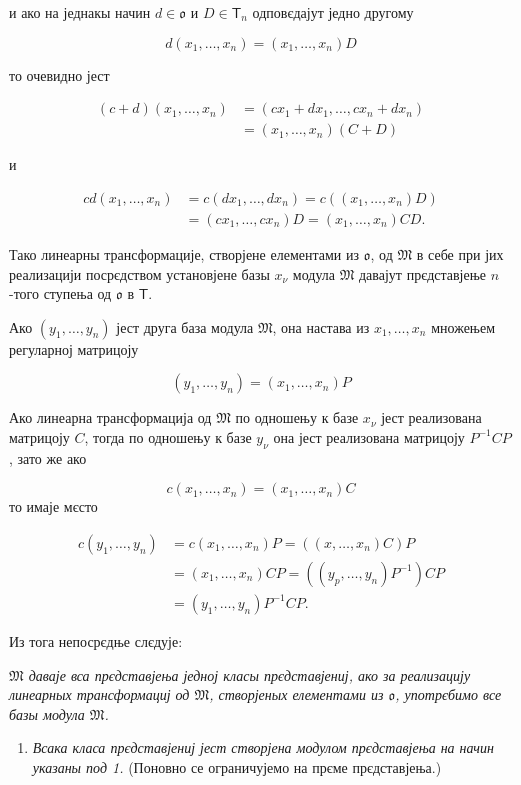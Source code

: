 \documentclass[11pt]{article}
\providecommand{\tightlist}{\setlength{\itemsep}{0pt}\setlength{\parskip}{0pt}}
\begin{document}
и ако на једнакы начин \(d\in\mathfrak{o}\) и \(D\in\mathsf T_n\) одповєдајут једно другому

\[
d(x_1,\ldots,x_n)=(x_1,\ldots,x_n)D
\]

то очевидно јест

\[
\begin{aligned}
(c+d)(x_1,\ldots,x_n)
&=(cx_1+dx_1,\ldots,cx_n+dx_n)\\
&=(x_1,\ldots,x_n)(C+D)
\end{aligned}
\]

и

\[
\begin{aligned}
cd(x_1,\ldots,x_n)
&=c(dx_1,\ldots,dx_n)=c((x_1,\ldots,x_n)D)\\
&=(cx_1,\ldots,cx_n)D=(x_1,\ldots,x_n)CD.
\end{aligned}
\]

Тако линеарны трансформације, створјене елементами из \(\mathfrak{o}\), од \(\mathfrak M\) в себе при јих реализацији посрєдством установјене базы \(x_\nu\) модула \(\mathfrak M\) давајут прєдставјење \(n\)-того ступења од \(\mathfrak{o}\) в \(\mathsf T\).

Ако \((y_1,\ldots,y_n)\) јест друга база модула \(\mathfrak M\), она настава из \(x_1,\ldots,x_n\) множењем регуларној матрицоју

\[(y_1,\ldots,y_n)=(x_1,\ldots,x_n)P\]

Ако линеарна трансформација од \(\mathfrak M\) по одношењу к базе \(x_\nu\) јест реализована матрицоју \(C\), тогда по одношењу к базе \(y_\nu\) она јест реализована матрицоју \(P^{-1}CP\), зато же ако

\[c(x_1,\ldots,x_n)=(x_1,\ldots,x_n)C\]
то имаје мєсто

\[
\begin{aligned}
c(y_1,\ldots,y_n)
&=c(x_1,\ldots,x_n)P=((x,\ldots,x_n)C)P\\
&=(x_1,\ldots,x_n)CP=((y_p,\ldots,y_n)P^{-1})CP\\
&=(y_1,\ldots,y_n)P^{-1}CP.
\end{aligned}
\]

Из тога непосрєдње слєдује:

\emph{\(\mathfrak M\) даваје вса прєдставјења једној класы прєдставјениј, ако за реализацију линеарных трансформациј од \(\mathfrak M\), створјеных елементами из \(\mathfrak{o}\), употрєбимо все базы модула \(\mathfrak M\).}

\begin{enumerate}
\def\labelenumi{\arabic{enumi}.}
\setcounter{enumi}{1}
\tightlist
\item
  \emph{Всака класа прєдставјениј јест створјена модулом прєдставјења на начин указаны под 1.} (Поновно се ограничујемо на прєме прєдставјења.)
\end{enumerate}
\end{document}
